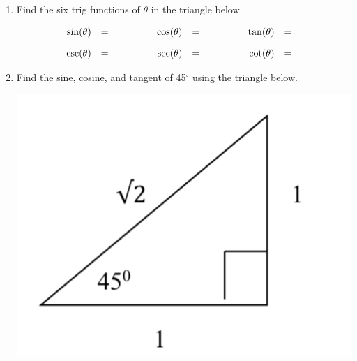 \begin{enumerate}
\item Find the six trig functions of $\theta$ in the triangle below.
  \begin{center}
\end{center}
\begin{eqnarray*}
  \begin{array}{rcl@{\hspace{4em}}rcl@{\hspace{4em}}rcl}
    \sin(\theta) & = &  & 
    \cos(\theta) & = &  &
    \tan(\theta) & = &  \\ [10pt]
    \csc(\theta) & = &  & 
    \sec(\theta) & = &  &
    \cot(\theta) & = & 
  \end{array}
\end{eqnarray*}

\item Find the sine, cosine, and tangent of 45$^{\circ}$ using the triangle below.

\includegraphics[scale=.6]{trigex2}\\



\end{enumerate}
